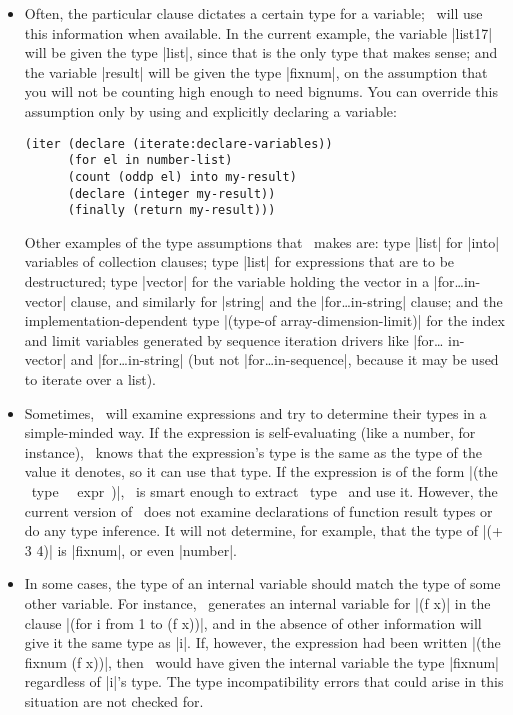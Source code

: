 \begin{itemize}

\item Often, the particular clause dictates a certain type for a
variable; \iter\ will use this information when available.  In the
current example, the variable |list17| will be given the type
|list|, since that is the only type that makes sense; and the
variable |result| will be given the type |fixnum|, on the
assumption that you will not be counting high enough to need bignums.
You can override this assumption only by using and explicitly declaring a
variable: 
\begin{verbatim}
(iter (declare (iterate:declare-variables))
      (for el in number-list)
      (count (oddp el) into my-result)
      (declare (integer my-result))
      (finally (return my-result)))
\end{verbatim}

\begin{sloppypar}
Other examples of the type assumptions that \iter\ makes are: type
|list| for |into| variables of collection clauses; type |list| for
expressions that are to be destructured; type |vector| for the
variable holding the vector in a |for\dots in-vector| clause, and
similarly for |string| and the |for\dots in-string| clause;
and the implementation-dependent type
|(type-of array-dimension-limit)| for the index and limit
variables generated by sequence iteration drivers like |for\dots
in-vector| and |for\dots in-string| (but not |for\dots in-sequence|,
because it may be used to iterate over a list). 
\end{sloppypar}

\item Sometimes, \iter\ will examine expressions and try to determine
their types in a simple-minded way.  If the expression is
self-evaluating (like a number, for instance), \iter\ knows that the
expression's type is the same as the type of the value it denotes, so
it can use that type.  If the expression is of the form |(the ~type~
~expr~)|, \iter\ is smart enough to extract ~type~ and use it.
However, the current version of \iter\ does not  
examine declarations of function result types or do any type
inference.  It will not determine, for 
example, that the type of |(+ 3 4)| is |fixnum|, or even
|number|.

\item In some cases, the type of an internal variable should match the
type of some other variable.  For instance, \iter\ generates an
internal variable for |(f x)| in the
clause |(for i from 1 to (f x))|, and in the absence of other
information will give it the same type as |i|.  If, however, the
expression had been written |(the fixnum (f x))|, then \iter\
would have given the internal variable the type |fixnum|
regardless of |i|'s type.  The type incompatibility errors that
could arise in this situation are not checked for.

\end{itemize}

